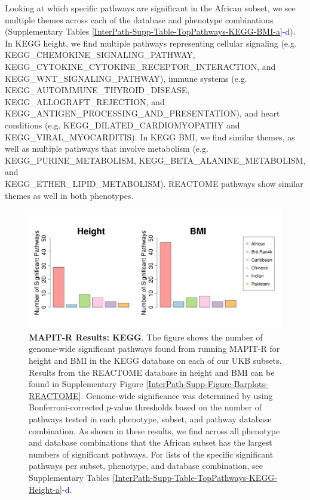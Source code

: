 \documentclass[12pt,a4paper]{article}
\begin{document}
Looking at which specific pathways are significant in the African subset, we see multiple themes across each of the database and phenotype combinations (Supplementary Tables \ref{InterPath-Supp-Table-TopPathways-KEGG-BMI-a}\textcolor{blue}{-d}). In KEGG height, we find multiple pathways representing cellular signaling (e.g. KEGG\_CHEMOKINE\_SIGNALING\_PATHWAY, KEGG\_CYTOKINE\_CYTOKINE\_RECEPTOR\_INTERACTION, and \\ KEGG\_WNT\_SIGNALING\_PATHWAY), immune systems (e.g. \\ KEGG\_AUTOIMMUNE\_THYROID\_DISEASE, KEGG\_ALLOGRAFT\_REJECTION, and KEGG\_ANTIGEN\_PROCESSING\_AND\_PRESENTATION), and heart conditions (e.g. KEGG\_DILATED\_CARDIOMYOPATHY and \\ KEGG\_VIRAL\_MYOCARDITIS). In KEGG BMI, we find similar themes, as well as multiple pathways that involve metabolism (e.g. KEGG\_PURINE\_METABOLISM, KEGG\_BETA\_ALANINE\_METABOLISM, and \\ KEGG\_ETHER\_LIPID\_METABOLISM). REACTOME pathways show similar themes as well in both phenotypes.

\begin{figure}[htb]
\centering
\hspace*{-.9cm}
\includegraphics[scale=.45]{Images/Main/InterPath_Main_Figure_Barplots_KEGG_vs2.png}
\caption[TBD]{\textbf{MAPIT-R Results: KEGG}. The figure shows the number of genome-wide significant pathways found from running MAPIT-R for height and BMI in the KEGG database on each of our UKB subsets. Results from the REACTOME database in height and BMI can be found in Supplementary Figure \ref{InterPath-Supp-Figure-Barplots-REACTOME}. Genome-wide significance was determined by using Bonferroni-corrected $p$-value thresholds based on the number of pathways tested in each phenotype, subset, and pathway database combination. As shown in these results, we find across all phenotype and database combinations that the African subset has the largest numbers of significant pathways. For lists of the specific significant pathways per subset, phenotype, and database combination, see Supplementary Tables \ref{InterPath-Supp-Table-TopPathways-KEGG-Height-a}\textcolor{blue}{-d}.}
\label{InterPath-Main-Figure-Barplots-KEGG}
\end{figure}
\end{document}
